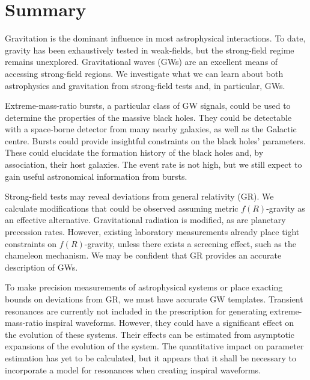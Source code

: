 \chapter{Summary}
\label{summary}

Gravitation is the dominant influence in most astrophysical interactions. To date, gravity has been exhaustively tested in weak-fields, but the strong-field regime remains unexplored. Gravitational waves (GWs) are an excellent means of accessing strong-field regions. We investigate what we can learn about both astrophysics and gravitation from strong-field tests and, in particular, GWs.

Extreme-mass-ratio bursts, a particular class of GW signals, could be used to determine the properties of the massive black holes. They could be detectable with a space-borne detector from many nearby galaxies, as well as the Galactic centre. Bursts could provide insightful constraints on the black holes' parameters. These could elucidate the formation history of the black holes and, by association, their host galaxies. The event rate is not high, but we still expect to gain useful astronomical information from bursts.

Strong-field tests may reveal deviations from general relativity (GR). We calculate modifications that could be observed assuming metric $f(R)$-gravity as an effective alternative. Gravitational radiation is modified, as are planetary precession rates. However, existing laboratory measurements already place tight constraints on $f(R)$-gravity, unless there exists a screening effect, such as the chameleon mechanism. We may be confident that GR provides an accurate description of GWs.

To make precision measurements of astrophysical systems or place exacting bounds on deviations from GR, we must have accurate GW templates. Transient resonances are currently not included in the prescription for generating extreme-mass-ratio inspiral waveforms. However, they could have a significant effect on the evolution of these systems. Their effects can be estimated from asymptotic expansions of the evolution of the system. The quantitative impact on parameter estimation has yet to be calculated, but it appears that it shall be necessary to incorporate a model for resonances when creating inspiral waveforms.